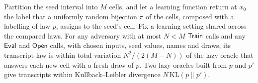 \begin{lemma}
Partition the seed interval into $M$ cells, and let a learning function return at
$x_0$ the label that a uniformly random bijection $\pi$ of the cells, composed with a
labelling of law $p$, assigns to the seed's cell. Fix a learning setting shared across
the compared laws. For any adversary with at most $N<M$ $\mathsf{Train}$ calls and any
$\mathsf{Eval}$ and $\mathsf{Open}$ calls, with chosen inputs, seed values, names and draws,
its transcript law is within total variation $N^2/(2(M-N))$ of the lazy oracle that
answers each new cell with a fresh draw of $p$. Two lazy oracles built from $p$ and
$p'$ give transcripts within Kullback--Leibler divergence $N\,\mathrm{KL}(p\|p')$.
\end{lemma}

